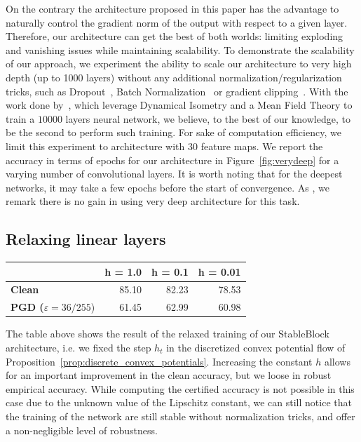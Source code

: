On the contrary the architecture proposed in this paper has the advantage to naturally control the gradient norm of the output with respect to a given layer.
Therefore, our architecture can get the best of both worlds: limiting exploding and vanishing issues while maintaining scalability. 
To demonstrate the scalability of our approach, we experiment the ability to scale our architecture to very high depth (up to 1000 layers) without any additional normalization/regularization tricks, such as Dropout~\citep{srivastava2014dropout}, Batch Normalization~\citep{ioffe2015batch} or gradient clipping~\citep{pascanu2013difficulty}.
With the work done by~\cite{xiao2018dynamical}, which leverage Dynamical Isometry and a Mean Field Theory to train a $10000$ layers neural network, we believe, to the best of our knowledge, to be the second to perform such training. 
For sake of computation efficiency, we limit this experiment to architecture with $30$ feature maps.
We report the accuracy in terms of epochs for our architecture in Figure~\ref{fig:verydeep} for a varying number of convolutional layers.
It is worth noting that for the deepest networks, it may take a few epochs before the start of convergence.
As \cite{xiao2018dynamical}, we remark there is no gain in using very deep architecture for this task.


\subsection{Relaxing linear layers}

\begin{center}
\begin{tabular}{lrrr}
\toprule
  & \multicolumn{1}{c}{\textbf{h = 1.0}} & \multicolumn{1}{c}{\textbf{h = 0.1}} & \multicolumn{1}{c}{\textbf{h = 0.01}} \\
\midrule
\textbf{Clean} & 85.10 & 82.23 & 78.53 \\
\textbf{PGD ($\varepsilon = 36/255$}) & 61.45 & 62.99 & 60.98 \\
\bottomrule
\end{tabular}%
\end{center}
The table above shows the result of the relaxed training of our StableBlock architecture, i.e. we fixed the step $h_t$ in the discretized convex potential flow of Proposition~\ref{prop:discrete_convex_potentials}.
Increasing the constant $h$ allows for an important improvement  in the clean accuracy, but we loose in robust empirical accuracy.
While computing the certified accuracy is not possible in this case due to the unknown value of the Lipschitz constant, we can still notice that the training of the network are still stable without normalization tricks, and offer a non-negligible level of robustness. 





